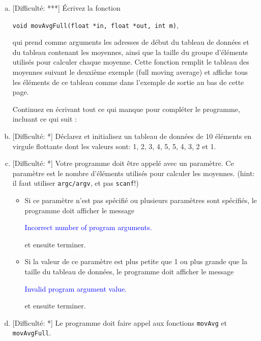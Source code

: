 \documentclass[11pt]{article}
\begin{document}
\begin{enumerate}[a)]
\item \textcolor{mygreen}{[Difficulté: ***]}
Écrivez la fonction

\begin{center} 
\texttt{void movAvgFull(float *in, float *out, int m)}, 
\end{center}

qui prend comme arguments les adresses de début du tableau de données et du tableau contenant les moyennes, ainsi que la taille du groupe d'éléments utilisés pour calculer chaque moyenne. Cette fonction remplit le tableau des moyennes suivant le deuxième exemple (full moving average) et affiche tous les éléments de ce tableau comme dans l'exemple de sortie au bas de cette page.

\vspace{20pt}
\hspace{-20pt} Continuez en écrivant tout ce qui manque pour compléter le programme, incluant ce qui suit :
\vspace{20pt}

\item \textcolor{mygreen}{[Difficulté: *]} Déclarez et initialisez un tableau de données de 10 éléments en virgule flottante dont les valeurs sont: 1, 2, 3, 4, 5, 5, 4, 3, 2 et 1.

\item \textcolor{mygreen}{[Difficulté: *]}  Votre programme doit être appelé avec un paramètre. Ce paramètre est le nombre d'éléments utilisés pour calculer les moyennes. (hint: il faut utiliser \texttt{argc/argv}, et pas \texttt{scanf}!)
	\begin{itemize}

	\item Si ce paramètre n'est pas spécifié ou plusieurs paramètres sont spécifiés, le programme doit afficher le message
	\begin{center}
	\textcolor{blue}{Incorrect number of program arguments.}
	\end{center}
	et ensuite terminer.

	\item Si la valeur de ce  paramètre est plus petite que 1 ou plus grande que la taille du tableau de données, le programme doit afficher le message
	\begin{center}
	\textcolor{blue}{Invalid program argument value.}
	\end{center}
	et ensuite terminer.

	\end{itemize}

\item \textcolor{mygreen}{[Difficulté: *]}  Le programme doit faire appel aux fonctions \texttt{movAvg} et \texttt{movAvgFull}.
\end{enumerate}
\end{document}
